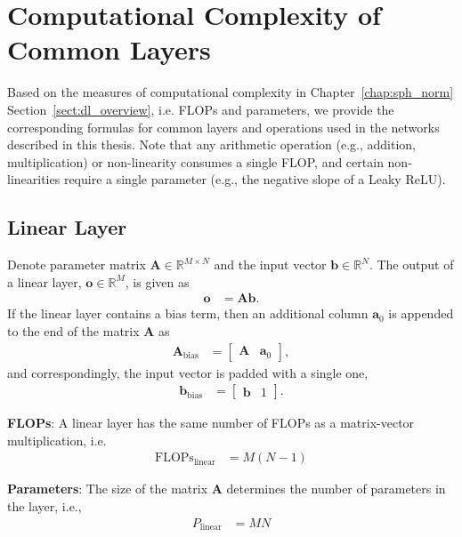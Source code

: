 \chapter{Computational Complexity of Common Layers}
\label{appdx:complexity}
Based on the measures of computational complexity in Chapter~\ref{chap:sph_norm} Section~\ref{sect:dl_overview}, i.e. FLOPs and parameters, we provide the corresponding formulas for common layers and operations used in the networks described in this thesis. Note that any arithmetic operation (e.g., addition, multiplication) or non-linearity consumes a single FLOP, and certain non-linearities require a single parameter (e.g., the negative slope of a Leaky ReLU).

\section{Linear Layer} \label{appdx:complexity-linear}
Denote parameter matrix $\mathbf{A}\in\mathbb{R}^{M\times N}$ and the input vector $\mathbf{b}\in\mathbb{R}^{N}$. The output of a linear layer, $\mathbf{o}\in\mathbb{R}^M$, is given as
\begin{align*}
	\mathbf{o} &= \mathbf{A}\mathbf{b}.
\end{align*}
If the linear layer contains a bias term, then an additional column $\mathbf{a}_0$ is appended to the end of the matrix $\mathbf{A}$ as
\begin{align*}
	\mathbf{A}_{\text{bias}} &= \begin{bmatrix}\mathbf{A} & \mathbf{a}_0\end{bmatrix},
\end{align*}
and correspondingly, the input vector is padded with a single one,
\begin{align*}
	\mathbf{b}_{\text{bias}} &= \begin{bmatrix}\mathbf{b} & 1\end{bmatrix}.
\end{align*}

\textbf{FLOPs}: A linear layer has the same number of FLOPs as a matrix-vector multiplication, i.e.
\begin{align*}
	\text{FLOPs}_{\text{linear}} &= M(N-1)
\end{align*}

\textbf{Parameters}: The size of the matrix $\mathbf{A}$ determines the number of parameters in the layer, i.e.,
\begin{align*}
	P_{\text{linear}} &= MN
\end{align*}

